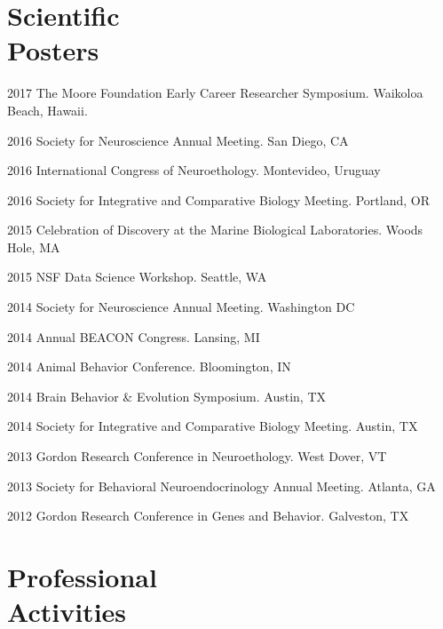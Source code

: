 \documentclass[margin,line]{resume}
\begin{document}
\begin{resume}

\section{\mysidestyle Scientific\\Posters}

\begin{list1}

\item[]2017	The Moore Foundation Early Career Researcher Symposium. Waikoloa Beach, Hawaii.
\item[]2016	Society for Neuroscience Annual Meeting. San Diego, CA
\item[]2016	International Congress of Neuroethology. Montevideo, Uruguay
\item[]2016 	Society for Integrative and Comparative Biology Meeting. Portland, OR
\item[]2015	Celebration of Discovery at the Marine Biological Laboratories. Woods Hole, MA
\item[]2015	NSF Data Science Workshop. Seattle, WA
\item[]2014	Society for Neuroscience Annual Meeting. Washington DC
\item[]2014	Annual BEACON Congress. Lansing, MI
\item[]2014	Animal Behavior Conference. Bloomington, IN
\item[]2014	Brain Behavior \& Evolution Symposium. Austin, TX
\item[]2014	Society for Integrative and Comparative Biology Meeting. Austin, TX
\item[]2013	Gordon Research Conference in Neuroethology. West Dover, VT
\item[]2013	Society for Behavioral Neuroendocrinology Annual Meeting. Atlanta, GA
\item[]2012	Gordon Research Conference in Genes and Behavior. Galveston, TX

\end{list1}
    
    
    \section{\mysidestyle Professional\\Activities}


\end{resume}
\end{document}
